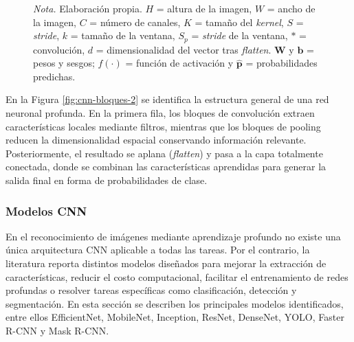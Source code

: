 \begin{figure}[h]
{%
    }
    
    \vspace{2mm}
    
    \begin{flushleft}
    \footnotesize
    \textit{Nota.} Elaboración propia. $H$ = altura de la imagen, $W$ = ancho de la imagen, $C$ = número de canales, $K$ = tamaño del \textit{kernel}, $S$ = \textit{stride}, $k$ = tamaño de la ventana, $S_p$ = \textit{stride} de la ventana, $*$ = convolución, $d$ = dimensionalidad del vector tras \textit{flatten}. $\mathbf{W}$ y $\mathbf{b}$ = pesos y sesgos; $f(\cdot)$ = función de activación y $\hat{\mathbf{p}}$ = probabilidades predichas.
    \end{flushleft}
    
\end{figure}

En la Figura \ref{fig:cnn-bloques-2} se identifica la estructura general de una red neuronal profunda. En la primera fila, los bloques de convolución extraen características locales mediante filtros, mientras que los bloques de pooling reducen la dimensionalidad espacial conservando información relevante. Posteriormente, el resultado se aplana (\textit{flatten}) y pasa a la capa totalmente conectada, donde se combinan las características aprendidas para generar la salida final en forma de probabilidades de clase.

\subsubsection{Modelos CNN}

En el reconocimiento de imágenes mediante aprendizaje profundo no existe una única arquitectura CNN aplicable a todas las tareas. Por el contrario, la literatura reporta distintos modelos diseñados para mejorar la extracción de características, reducir el costo computacional, facilitar el entrenamiento de redes profundas o resolver tareas específicas como clasificación, detección y segmentación. En esta sección se describen los principales modelos identificados, entre ellos EfficientNet, MobileNet, Inception, ResNet, DenseNet, YOLO, Faster R-CNN y Mask R-CNN. 


